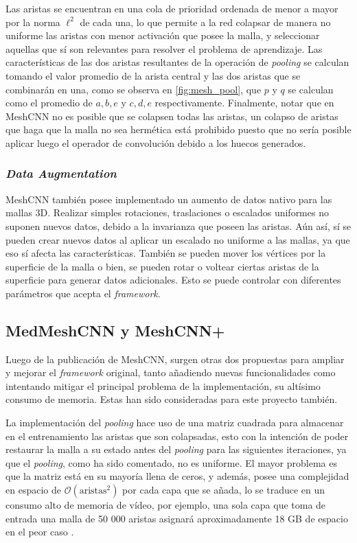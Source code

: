 Las aristas se encuentran en una cola de prioridad ordenada de menor a mayor por la norma $\ell^2$ de cada una, lo que permite a la red colapsar de manera no uniforme las aristas con menor activación que posee la malla, y seleccionar aquellas que sí son relevantes para resolver el problema de aprendizaje. Las características de las dos aristas resultantes de la operación de \textit{pooling} se calculan tomando el valor promedio de la arista central y las dos aristas que se combinarán en una, como se observa en \ref{fig:mesh_pool}, que $p$ y $q$ se calculan como el promedio de $a,b,e$ y $c,d,e$ respectivamente. Finalmente, notar que en MeshCNN no es posible que se colapsen todas las aristas, un colapso de aristas que haga que la malla no sea hermética está prohibido puesto que no sería posible aplicar luego el operador de convolución debido a los huecos generados. 

\subsubsection{\textit{Data Augmentation}}
MeshCNN también posee implementado un aumento de datos nativo para las mallas 3D. Realizar simples rotaciones, traslaciones o escalados uniformes no suponen nuevos datos, debido a la invarianza que poseen las aristas. Aún así, sí se pueden crear nuevos datos al aplicar un escalado no uniforme a las mallas, ya que eso sí afecta las características. También se pueden mover los vértices por la superficie de la malla o bien, se pueden rotar o voltear ciertas aristas de la superficie para generar datos adicionales. Esto se puede controlar con diferentes parámetros que acepta el \textit{framework}.

\subsection{MedMeshCNN y MeshCNN+}
\label{section:medMeshCNN}

Luego de la publicación de MeshCNN, surgen otras dos propuestas para ampliar y mejorar el \textit{framework} original, tanto añadiendo nuevas funcionalidades como intentando mitigar el principal problema de la implementación, su altísimo consumo de memoria. Estas han sido consideradas para este proyecto también.

La implementación del \textit{pooling} hace uso de una matriz cuadrada para almacenar en el entrenamiento las aristas que son colapsadas, esto con la intención de poder restaurar la malla a su estado antes del \textit{pooling} para las siguientes iteraciones, ya que el \textit{pooling}, como ha sido comentado, no es uniforme. El mayor problema es que la matriz está en su mayoría llena de ceros, y además, posee una complejidad en espacio de $\mathcal{O}(\text{aristas}^2)$ por cada capa que se añada, lo se traduce en un consumo alto de memoria de vídeo, por ejemplo, una sola capa que toma de entrada una malla de 50 000 aristas asignará aproximadamente 18 GB de espacio en el peor caso \cite{mandado_surface_2021}.

